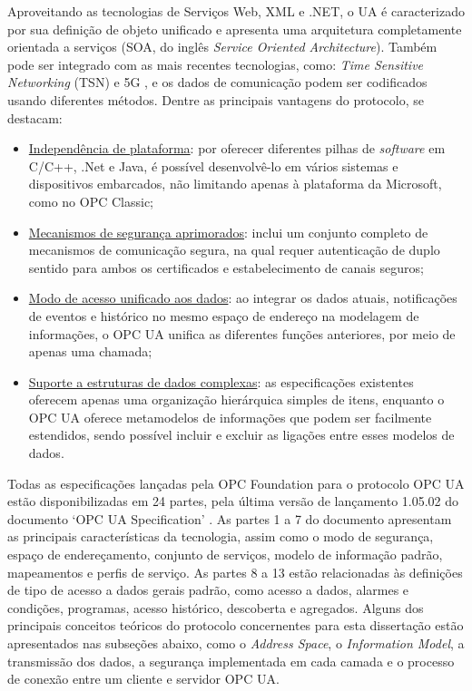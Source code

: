         Aproveitando as tecnologias de Serviços Web, XML e .NET, o UA é caracterizado por sua definição de objeto unificado e apresenta uma arquitetura completamente orientada a serviços (SOA, do inglês \textit{Service Oriented Architecture}). Também pode ser integrado com as mais recentes tecnologias, como: \textit{Time Sensitive Networking} (TSN) e 5G \cite{han2022}, e os dados de comunicação podem ser codificados usando diferentes métodos. Dentre as principais vantagens do protocolo, se destacam:
    
        \begin{itemize}
            \item \underline{Independência de plataforma}: por oferecer diferentes pilhas de \textit{software} em C/C++, .Net e Java, é possível desenvolvê-lo em vários sistemas e dispositivos embarcados, não limitando apenas à plataforma da Microsoft, como no OPC Classic;
            \item \underline{Mecanismos de segurança aprimorados}: inclui um conjunto completo de mecanismos de comunicação segura, na qual requer autenticação de duplo sentido para ambos os certificados e estabelecimento de canais seguros;
            \item \underline{Modo de acesso unificado aos dados}: ao integrar os dados atuais, notificações de eventos e histórico no mesmo espaço de endereço na modelagem de informações, o OPC UA unifica as diferentes funções anteriores, por meio de apenas uma chamada;
            \item \underline{Suporte a estruturas de dados complexas}: as especificações existentes oferecem apenas uma organização hierárquica simples de itens, enquanto o OPC UA oferece metamodelos de informações que podem ser facilmente estendidos, sendo possível incluir e excluir as ligações entre esses modelos de dados.
        \end{itemize}
        
        Todas as especificações lançadas pela OPC Foundation para o protocolo OPC UA estão disponibilizadas em 24 partes, pela última versão de lançamento 1.05.02 do documento `OPC UA Specification' \cite{opc2022}. As partes 1 a 7 do documento apresentam as principais características da tecnologia, assim como o modo de segurança, espaço de endereçamento, conjunto de serviços, modelo de informação padrão, mapeamentos e perfis de serviço. As partes 8 a 13 estão relacionadas às definições de tipo de acesso a dados gerais padrão, como acesso a dados, alarmes e condições, programas, acesso histórico, descoberta e agregados. Alguns dos principais conceitos teóricos do protocolo concernentes para esta dissertação estão apresentados nas subseções abaixo, como o \textit{Address Space}, o \textit{Information Model}, a transmissão dos dados, a segurança implementada em cada camada e o processo de conexão entre um cliente e servidor OPC UA.
    
